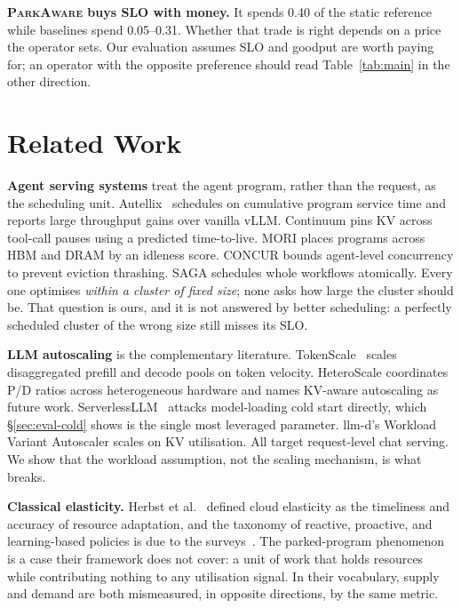 \documentclass[sigconf,nonacm]{acmart}
\newcommand{\sys}{\textsc{ParkAware}\xspace}
\begin{document}
\textbf{\sys buys SLO with money.} It spends 0.40 of the static reference
while baselines spend 0.05--0.31. Whether that trade is right depends on a
price the operator sets. Our evaluation assumes SLO and goodput are worth
paying for; an operator with the opposite preference should read
Table~\ref{tab:main} in the other direction.

\section{Related Work}

\textbf{Agent serving systems} treat the agent program, rather than the
request, as the scheduling unit. Autellix~\cite{autellix} schedules on
cumulative program service time and reports large throughput gains over
vanilla vLLM. Continuum pins KV across tool-call pauses using a predicted
time-to-live. MORI places programs across HBM and DRAM by an idleness
score. CONCUR bounds agent-level concurrency to prevent eviction
thrashing. SAGA schedules whole workflows atomically. Every one optimises
\emph{within a cluster of fixed size}; none asks how large the cluster
should be. That question is ours, and it is not answered by better
scheduling: a perfectly scheduled cluster of the wrong size still misses
its SLO.

\textbf{LLM autoscaling} is the complementary literature.
TokenScale~\cite{tokenscale} scales disaggregated prefill and decode
pools on token velocity. HeteroScale coordinates P/D ratios across
heterogeneous hardware and names KV-aware autoscaling as future work.
ServerlessLLM~\cite{serverlessllm} attacks model-loading cold start
directly, which \S\ref{sec:eval-cold} shows is the single most leveraged
parameter. llm-d's Workload Variant Autoscaler scales on KV utilisation.
All target request-level chat serving. We show that the workload
assumption, not the scaling mechanism, is what breaks.

\textbf{Classical elasticity.} Herbst et al.~\cite{herbst} defined cloud
elasticity as the timeliness and accuracy of resource adaptation, and the
taxonomy of reactive, proactive, and learning-based policies is due to the
surveys~\cite{gari}. The parked-program phenomenon is a case their
framework does not cover: a unit of work that holds resources while
contributing nothing to any utilisation signal. In their vocabulary,
supply and demand are both mismeasured, in opposite directions, by the
same metric.
\end{document}
